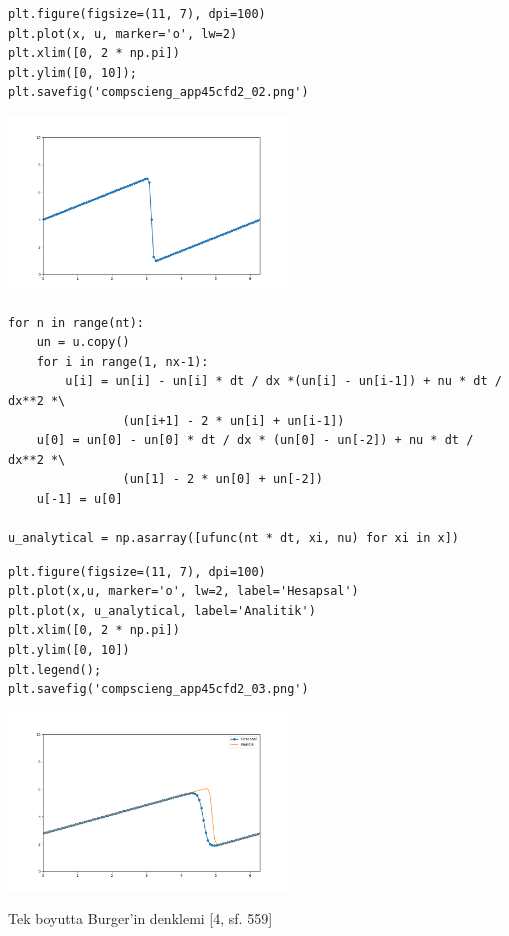 \documentclass[12pt,fleqn]{article}\usepackage{../../common}
\begin{document}
\begin{verbatim}
plt.figure(figsize=(11, 7), dpi=100)
plt.plot(x, u, marker='o', lw=2)
plt.xlim([0, 2 * np.pi])
plt.ylim([0, 10]);
plt.savefig('compscieng_app45cfd2_02.png')
\end{verbatim}


\includegraphics[width=20em]{compscieng_app45cfd2_02.png}

\begin{verbatim}
for n in range(nt):
    un = u.copy()
    for i in range(1, nx-1):
        u[i] = un[i] - un[i] * dt / dx *(un[i] - un[i-1]) + nu * dt / dx**2 *\
                (un[i+1] - 2 * un[i] + un[i-1])
    u[0] = un[0] - un[0] * dt / dx * (un[0] - un[-2]) + nu * dt / dx**2 *\
                (un[1] - 2 * un[0] + un[-2])
    u[-1] = u[0]
        
u_analytical = np.asarray([ufunc(nt * dt, xi, nu) for xi in x])
\end{verbatim}

\begin{verbatim}
plt.figure(figsize=(11, 7), dpi=100)
plt.plot(x,u, marker='o', lw=2, label='Hesapsal')
plt.plot(x, u_analytical, label='Analitik')
plt.xlim([0, 2 * np.pi])
plt.ylim([0, 10])
plt.legend();
plt.savefig('compscieng_app45cfd2_03.png')
\end{verbatim}


\includegraphics[width=20em]{compscieng_app45cfd2_03.png}

Tek boyutta Burger'in denklemi [4, sf. 559]
\end{document}
